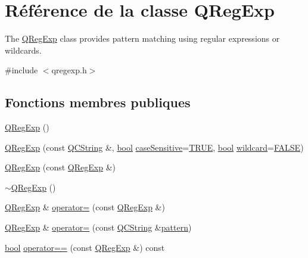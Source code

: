 \hypertarget{class_q_reg_exp}{}\section{Référence de la classe Q\+Reg\+Exp}
\label{class_q_reg_exp}


The \hyperlink{class_q_reg_exp}{Q\+Reg\+Exp} class provides pattern matching using regular expressions or wildcards.  




{\ttfamily \#include $<$qregexp.\+h$>$}

\subsection*{Fonctions membres publiques}
\begin{DoxyCompactItemize}
\item 
\hyperlink{class_q_reg_exp_a65d0a33606138cfe702c629566415518}{Q\+Reg\+Exp} ()
\item 
\hyperlink{class_q_reg_exp_a2706f7fb6279510e07e9285040c8758e}{Q\+Reg\+Exp} (const \hyperlink{class_q_c_string}{Q\+C\+String} \&, \hyperlink{qglobal_8h_a1062901a7428fdd9c7f180f5e01ea056}{bool} \hyperlink{class_q_reg_exp_ae1d7417c0cea939823d1101da3a22dd5}{case\+Sensitive}=\hyperlink{qglobal_8h_a04a6422a52070f0dc478693da640242b}{T\+R\+U\+E}, \hyperlink{qglobal_8h_a1062901a7428fdd9c7f180f5e01ea056}{bool} \hyperlink{class_q_reg_exp_a52445cdcf77f2396764c23dcfdcdd0f6}{wildcard}=\hyperlink{qglobal_8h_a10e004b6916e78ff4ea8379be80b80cc}{F\+A\+L\+S\+E})
\item 
\hyperlink{class_q_reg_exp_ac60dcc085567049d803a6aa51df69cc2}{Q\+Reg\+Exp} (const \hyperlink{class_q_reg_exp}{Q\+Reg\+Exp} \&)
\item 
\hyperlink{class_q_reg_exp_a560f33f2c289de7d88b393c00dda4d22}{$\sim$\+Q\+Reg\+Exp} ()
\item 
\hyperlink{class_q_reg_exp}{Q\+Reg\+Exp} \& \hyperlink{class_q_reg_exp_ad226f89bfe9bda3b00ddbbcaf1179cc7}{operator=} (const \hyperlink{class_q_reg_exp}{Q\+Reg\+Exp} \&)
\item 
\hyperlink{class_q_reg_exp}{Q\+Reg\+Exp} \& \hyperlink{class_q_reg_exp_a71ff6aeb87b7ec3d8b97c18dbf68947f}{operator=} (const \hyperlink{class_q_c_string}{Q\+C\+String} \&\hyperlink{class_q_reg_exp_a7351e1e57c360c96aaeb08e1e7411f7f}{pattern})
\item 
\hyperlink{qglobal_8h_a1062901a7428fdd9c7f180f5e01ea056}{bool} \hyperlink{class_q_reg_exp_ab96a1d09e3661508cd40f21c21530a04}{operator==} (const \hyperlink{class_q_reg_exp}{Q\+Reg\+Exp} \&) const 

\end{DoxyCompactItemize}
